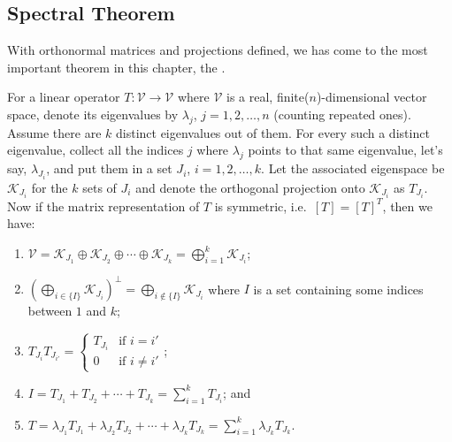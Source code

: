 \subsection{Spectral Theorem}
With orthonormal matrices and projections defined, we has come to the most important theorem in this chapter, the .
\begin{thm}
\label{thm:spectral}
For a linear operator $T: \mathcal{V} \to \mathcal{V}$ where $\mathcal{V}$ is a real, finite($n$)-dimensional vector space, denote its eigenvalues by $\lambda_j$, $j = 1,2,\ldots,n$ (counting repeated ones). Assume there are $k$ distinct eigenvalues out of them. For every such a distinct eigenvalue, collect all the indices $j$ where $\lambda_j$ points to that same eigenvalue, let's say, $\lambda_{J_i}$, and put them in a set $J_i$, $i = 1,2,\ldots,k$. Let the associated eigenspace be $\mathcal{K}_{J_i}$ for the $k$ sets of $J_i$ and denote the orthogonal projection onto $\mathcal{K}_{J_i}$ as $T_{J_i}$. Now if the matrix representation of $T$ is symmetric, i.e.\ $[T]=[T]^T$, then we have:
\begin{enumerate}[label=(\alph*)]
\item $\mathcal{V} = \mathcal{K}_{J_1} \oplus \mathcal{K}_{J_2} \oplus \cdots \oplus \mathcal{K}_{J_k} = \bigoplus_{i=1}^{k} \mathcal{K}_{J_i}$;
\item $(\bigoplus_{i \in \{I\}} \mathcal{K}_{J_i})^\perp = \bigoplus_{i \notin \{I\}} \mathcal{K}_{J_i}$ where $I$ is a set containing some indices between $1$ and $k$;
\item $T_{J_i} T_{J_{i'}} = 
\begin{cases}
T_{J_i} & \text{if $i = i'$} \\
0 & \text{if $i \neq i'$}
\end{cases}$;
\item $I = T_{J_1} + T_{J_2} + \cdots + T_{J_k} = \sum_{i=1}^{k} T_{J_i}$; and
\item $T = \lambda_{J_1}T_{J_1} + \lambda_{J_2}T_{J_2} + \cdots + \lambda_{J_k}T_{J_k} = \sum_{i=1}^{k} \lambda_{J_k}T_{J_k}$.
\end{enumerate}
\end{thm}
